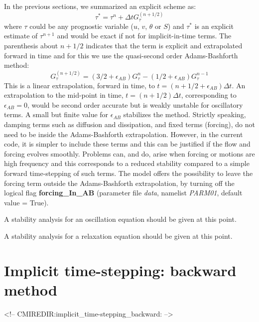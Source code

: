 In the previous sections, we summarized an explicit scheme as:
\begin{equation}
\tau^{*} = \tau^{n} + \Delta t G_\tau^{(n+1/2)}
\label{eq:taustar}
\end{equation}
where $\tau$ could be any prognostic variable ($u$, $v$, $\theta$ or
$S$) and $\tau^*$ is an explicit estimate of $\tau^{n+1}$ and would be
exact if not for implicit-in-time terms. The parenthesis about $n+1/2$
indicates that the term is explicit and extrapolated forward in time
and for this we use the quasi-second order Adams-Bashforth method:
\begin{equation}
G_\tau^{(n+1/2)} = ( 3/2 + \epsilon_{AB}) G_\tau^n
- ( 1/2 + \epsilon_{AB}) G_\tau^{n-1}
\label{eq:adams-bashforth2}
\end{equation}
This is a linear extrapolation, forward in time, to
$t=(n+1/2+{\epsilon_{AB}})\Delta t$. An extrapolation to the mid-point
in time, $t=(n+1/2)\Delta t$, corresponding to $\epsilon_{AB}=0$,
would be second order accurate but is weakly unstable for oscillatory
terms. A small but finite value for $\epsilon_{AB}$ stabilizes the
method. Strictly speaking, damping terms such as diffusion and
dissipation, and fixed terms (forcing), do not need to be inside the
Adams-Bashforth extrapolation. However, in the current code, it is
simpler to include these terms and this can be justified if the flow
and forcing evolves smoothly. Problems can, and do, arise when forcing
or motions are high frequency and this corresponds to a reduced
stability compared to a simple forward time-stepping of such terms.
The model offers the possibility to leave the forcing term outside the 
Adams-Bashforth extrapolation, by turning off the logical flag 
{\bf forcing\_In\_AB } (parameter file {\em data}, namelist {\em PARM01}, 
default value = True).

A stability analysis for an oscillation equation should be given at this point.

A stability analysis for a relaxation equation should be given at this point.


\section{Implicit time-stepping: backward method}
\begin{rawhtml}
<!-- CMIREDIR:implicit_time-stepping_backward: -->
\end{rawhtml}

